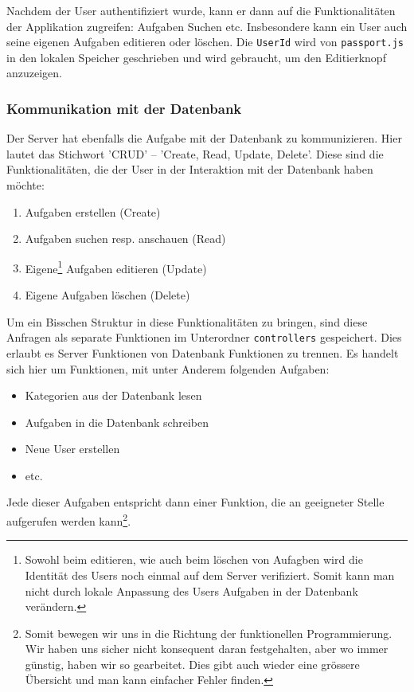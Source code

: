 Nachdem der User authentifiziert wurde, kann er dann auf die Funktionalitäten der Applikation zugreifen: Aufgaben Suchen etc. Insbesondere kann ein User auch seine eigenen Aufgaben editieren oder löschen. Die \verb|UserId| wird von \verb|passport.js| in den lokalen Speicher geschrieben und wird gebraucht, um den Editierknopf anzuzeigen. 

\subsubsection{Kommunikation mit der Datenbank}

Der Server hat ebenfalls die Aufgabe mit der Datenbank zu kommunizieren. Hier lautet das Stichwort 'CRUD' -- 'Create, Read, Update, Delete'. Diese sind die Funktionalitäten, die der User in der Interaktion mit der Datenbank haben möchte:
\begin{enumerate}
    \item Aufgaben erstellen (Create)
    \item Aufgaben suchen resp. anschauen (Read)
    \item Eigene\footnote{Sowohl beim editieren, wie auch beim löschen von Aufagben wird die Identität des Users noch einmal auf dem Server verifiziert. Somit kann man nicht durch lokale Anpassung des Users Aufgaben in der Datenbank verändern.} Aufgaben editieren (Update)
    \item Eigene Aufgaben löschen (Delete)
\end{enumerate}

Um ein Bisschen Struktur in diese Funktionalitäten zu bringen, sind diese Anfragen als separate Funktionen im Unterordner \verb|controllers| gespeichert. Dies erlaubt es Server Funktionen von Datenbank Funktionen zu trennen. Es handelt sich hier um Funktionen, mit unter Anderem folgenden Aufgaben:
\begin{itemize}
    \item Kategorien aus der Datenbank lesen
    \item Aufgaben in die Datenbank schreiben
    \item Neue User erstellen
    \item etc.
\end{itemize}

Jede dieser Aufgaben entspricht dann einer Funktion, die an geeigneter Stelle aufgerufen werden kann\footnote{Somit bewegen wir uns in die Richtung der funktionellen Programmierung. Wir haben uns sicher nicht konsequent daran festgehalten, aber wo immer günstig, haben wir so gearbeitet. Dies gibt auch wieder eine grössere Übersicht und man kann einfacher Fehler finden.}. 

